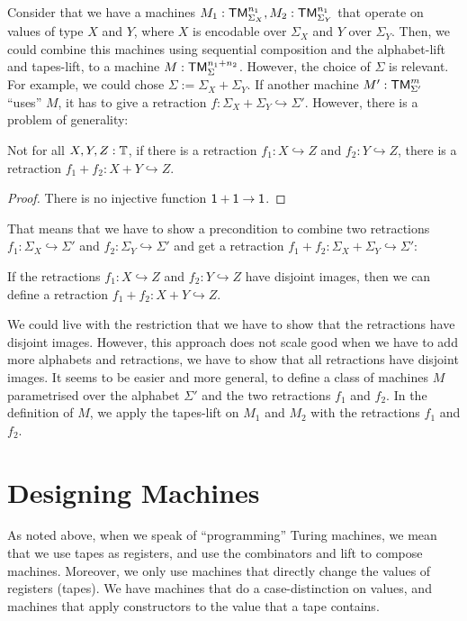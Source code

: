 Consider that we have a machines $M_1 : \mathsf{TM}_{\Sigma_X}^{n_1}, M_2 : \mathsf{TM}_{\Sigma_Y}^{n_1}$ that operate on values of type $X$ and $Y$, where $X$ is
encodable over $\Sigma_X$ and $Y$ over $\Sigma_Y$.  Then, we could combine this machines using sequential composition and the alphabet-lift and
tapes-lift, to a machine $M : \mathsf{TM}_\Sigma^{n_1+n_2}$.  However, the choice of $\Sigma$ is relevant.  For example, we could chose
$\Sigma := \Sigma_X + \Sigma_Y$.  If another machine $M' : \mathsf{TM}_{\Sigma'}^m$ ``uses'' $M$, it has to give a retraction
$f : \Sigma_X+\Sigma_Y \hookrightarrow \Sigma'$.  However, there is a problem of generality:
\begin{fact}
  Not for all $X, Y, Z : \mathbb{T}$, if there is a retraction $f_1 : X \hookrightarrow Z$ and $f_2 : Y \hookrightarrow Z$, there is a retraction
  $f_1+f_2 : X+Y \hookrightarrow Z$.
\end{fact}
\begin{proof}
  There is no injective function $\mathsf{1}+\mathsf{1}\rightarrow\mathsf{1}$.
\end{proof}

That means that we have to show a precondition to combine two retractions $f_1 : \Sigma_X \hookrightarrow \Sigma'$ and
$f_2 : \Sigma_Y \hookrightarrow \Sigma'$ and get a retraction $f_1+f_2 : \Sigma_X + \Sigma_Y \hookrightarrow \Sigma'$:
\begin{fact}
  If the retractions $f_1 : X \hookrightarrow Z$ and $f_2 : Y \hookrightarrow Z$ have disjoint images, then we can define a retraction
  $f_1+f_2 : X+Y \hookrightarrow Z$.
\end{fact}

We could live with the restriction that we have to show that the retractions have disjoint images.  However, this approach does not scale good when we
have to add more alphabets and retractions, we have to show that all retractions have disjoint images.  It seems to be easier and more general, to
define a class of machines $M$ parametrised over the alphabet $\Sigma'$ and the two retractions $f_1$ and $f_2$.  In the definition of $M$, we apply
the tapes-lift on $M_1$ and $M_2$ with the retractions $f_1$ and $f_2$.



\section{Designing Machines}
\label{sec:programming-design}

As noted above, when we speak of ``programming'' Turing machines, we mean that we use tapes as registers, and use the combinators and lift to compose
machines.  Moreover, we only use machines that directly change the values of registers (tapes).  We have machines that do a case-distinction on
values, and machines that apply constructors to the value that a tape contains.

